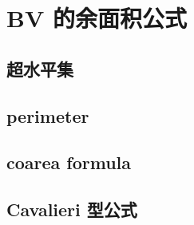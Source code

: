 \section{BV 的余面积公式}
\label{b1:sec:2703}


\subsection{超水平集}
\label{b1:subsec:270301}

\subsection{perimeter}
\label{b1:subsec:270302}

\subsection{coarea formula}
\label{b1:subsec:270303}

\subsection{Cavalieri 型公式}
\label{b1:subsec:270304}


